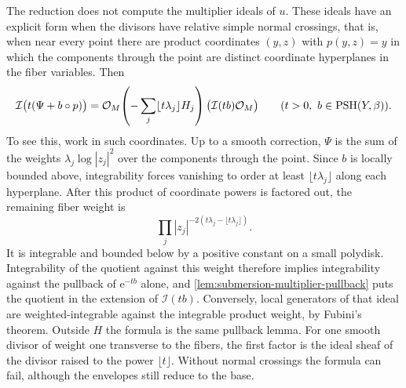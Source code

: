 The reduction does not compute the multiplier ideals of $u$. These ideals have an explicit form when the divisors have relative simple normal crossings, that is, when near every point there are product coordinates $(y,z)$ with $p(y,z)=y$ in which the components through the point are distinct coordinate hyperplanes in the fiber variables. Then
\begin{equation}\label{eq:divisorial-product-ideals}
 \mathcal I\bigl(t(\Psi+b\circ p)\bigr)
   =\mathcal O_M\!\left(-\sum_j\lfloor t\lambda_j\rfloor H_j\right)
                    \bigl(\mathcal I(tb)\mathcal O_M\bigr)
       \qquad(t>0,\ b\in\mathrm{PSH}(Y,\beta)).
\end{equation}
To see this, work in such coordinates. Up to a smooth correction, $\Psi$ is the sum of the weights $\lambda_j\log|z_j|^2$ over the components through the point. Since $b$ is locally bounded above, integrability forces vanishing to order at least $\lfloor t\lambda_j\rfloor$ along each hyperplane. After this product of coordinate powers is factored out, the remaining fiber weight is
\[
 \prod_j|z_j|^{-2(t\lambda_j-\lfloor t\lambda_j\rfloor)}.
\]
It is integrable and bounded below by a positive constant on a small polydisk. Integrability of the quotient against this weight therefore implies integrability against the pullback of $\mathrm e^{-tb}$ alone, and \cref{lem:submersion-multiplier-pullback} puts the quotient in the extension of $\mathcal I(tb)$. Conversely, local generators of that ideal are weighted-integrable against the integrable product weight, by Fubini's theorem. Outside $H$ the formula is the same pullback lemma. For one smooth divisor of weight one transverse to the fibers, the first factor is the ideal sheaf of the divisor raised to the power $\lfloor t\rfloor$. Without normal crossings the formula can fail, although the envelopes still reduce to the base.

